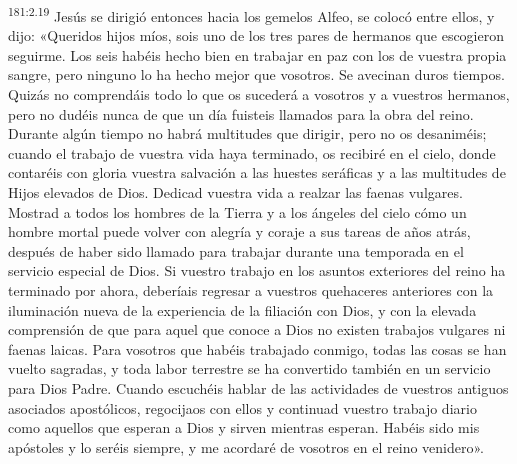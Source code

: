 \par 
\textsuperscript{181:2.19} Jesús se dirigió entonces hacia los gemelos Alfeo, se colocó entre ellos, y dijo: «Queridos hijos míos, sois uno de los tres pares de hermanos que escogieron seguirme. Los seis habéis hecho bien en trabajar en paz con los de vuestra propia sangre, pero ninguno lo ha hecho mejor que vosotros. Se avecinan duros tiempos. Quizás no comprendáis todo lo que os sucederá a vosotros y a vuestros hermanos, pero no dudéis nunca de que un día fuisteis llamados para la obra del reino. Durante algún tiempo no habrá multitudes que dirigir, pero no os desaniméis; cuando el trabajo de vuestra vida haya terminado, os recibiré en el cielo, donde contaréis con gloria vuestra salvación a las huestes seráficas y a las multitudes de Hijos elevados de Dios. Dedicad vuestra vida a realzar las faenas vulgares. Mostrad a todos los hombres de la Tierra y a los ángeles del cielo cómo un hombre mortal puede volver con alegría y coraje a sus tareas de años atrás, después de haber sido llamado para trabajar durante una temporada en el servicio especial de Dios. Si vuestro trabajo en los asuntos exteriores del reino ha terminado por ahora, deberíais regresar a vuestros quehaceres anteriores con la iluminación nueva de la experiencia de la filiación con Dios, y con la elevada comprensión de que para aquel que conoce a Dios no existen trabajos vulgares ni faenas laicas. Para vosotros que habéis trabajado conmigo, todas las cosas se han vuelto sagradas, y toda labor terrestre se ha convertido también en un servicio para Dios Padre. Cuando escuchéis hablar de las actividades de vuestros antiguos asociados apostólicos, regocijaos con ellos y continuad vuestro trabajo diario como aquellos que esperan a Dios y sirven mientras esperan. Habéis sido mis apóstoles y lo seréis siempre, y me acordaré de vosotros en el reino venidero».

